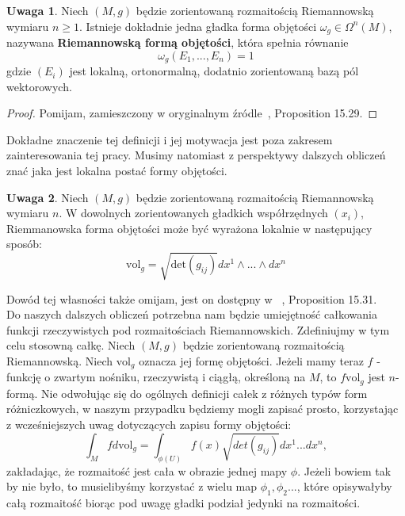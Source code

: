 \documentclass[licencjacka]{pracamgr}
\theoremstyle{definition}
\theoremstyle{definition}
\newtheorem{remark}{Uwaga}[section]
\theoremstyle{plain}
\theoremstyle{plain}
\theoremstyle{plain}
\theoremstyle{plain}
\begin{document}
\begin{remark}
Niech $(M, g)$ będzie zorientowaną rozmaitością Riemannowską wymiaru
$n \geq 1$. Istnieje dokładnie jedna gładka forma objętości
$\omega_g \in \Omega^n(M)$, nazywana \textbf{Riemannowską formą objętości},
która spełnia równanie
\[
\omega_g(E_1, ...,  E_n) = 1
\]
gdzie $(E_i)$ jest lokalną, ortonormalną, dodatnio zorientowaną bazą
pól wektorowych.
\end{remark}
\begin{proof}
Pomijam, zamieszczony w oryginalnym źródle~\cite{lee}, Proposition 15.29.
\end{proof}
Dokładne znaczenie tej definicji i jej motywacja jest poza
zakresem zainteresowania tej pracy. Musimy natomiast z perspektywy
dalszych obliczeń znać jaka jest lokalna postać formy objętości. \\

\begin{remark}\label{expression-for-volume-form}
Niech $(M, g)$ będzie zorientowaną rozmaitością Riemannowską wymiaru $n$.
 W dowolnych zorientowanych gładkich współrzędnych
$(x_i)$, Riemmanowska forma objętości może być wyrażona lokalnie w następujący
sposób:
\[
    \text{vol}_g = \sqrt{\text{det}(g_{ij})} dx^1 \wedge ... \wedge dx^n
\]
\end{remark}
Dowód tej własności także omijam, jest on dostępny w ~\cite{lee}, Proposition
15.31. \\

Do naszych dalszych obliczeń potrzebna nam będzie umiejętność całkowania
funkcji rzeczywistych pod rozmaitościach Riemannowskich. Zdefiniujmy w tym celu
stosowną całkę.
Niech $(M, g)$ będzie zorientowaną rozmaitością Riemannowską. 
Niech $\text{vol}_g$ oznacza jej formę objętości. Jeżeli mamy teraz $f$ -
funkcję o zwartym nośniku, rzeczywistą i ciągłą, określoną na $M$, to
$f \text{vol}_g$ jest $n$-formą.
Nie odwołując się do ogólnych definicji całek z różnych typów form
różniczkowych, w naszym przypadku będziemy mogli zapisać prosto, korzystając z
wcześniejszych uwag dotyczących zapisu formy objętości:
\[ %
  \int_M f d \text{vol}_g = \int_{\phi (U)} f(x) \sqrt{det(g_{ij})} dx^1 ... dx^n,
\]
zakładając, że rozmaitość jest cała w obrazie jednej mapy
$\phi$. Jeżeli bowiem tak by nie było, to musielibyśmy korzystać z
wielu map $\phi_1, \phi_2 ... $, które opisywałyby całą rozmaitość
biorąc pod uwagę gładki podział jedynki na rozmaitości. \\
\end{document}

